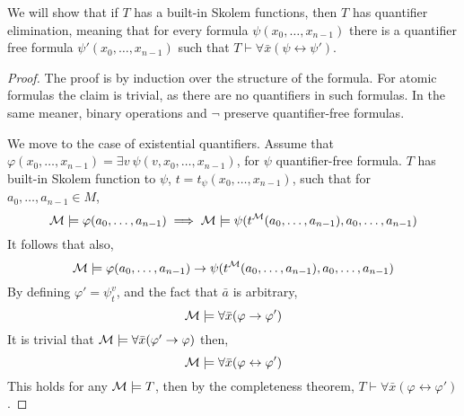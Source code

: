 \subquestion{}
We will show that if $T$ has a built-in Skolem functions, then $T$ has quantifier elimination,
meaning that for every formula $\psi(x_0, \ldots, x_{n - 1})$ there is a quantifier free formula $\psi'(x_0, \ldots, x_{n - 1})$ such that $T \vdash \forall \bar{x} (\psi \leftrightarrow \psi')$.
\begin{proof}
	The proof is by induction over the structure of the formula.
	For atomic formulas the claim is trivial, as there are no quantifiers in such formulas.
	In the same meaner, binary operations and $\lnot$ preserve quantifier-free formulas.

	We move to the case of existential quantifiers.
	Assume that $\varphi(x_0, \ldots, x_{n - 1}) = \exists v\ \psi(v, x_0, \ldots, x_{n - 1})$, for $\psi$ quantifier-free formula.
	$T$ has built-in Skolem function to $\psi$, $t = t_{\psi}(x_0, \ldots, x_{n - 1})$, such that for $a_0, \ldots, a_{n - 1} \in M$,
	\[
		\mathcal{M} \models \varphi(a_0, \ldots, a_{n - 1})
		\implies \mathcal{M} \models \psi(t^{\mathcal{M}}(a_0, \ldots, a_{n - 1}), a_0, \ldots, a_{n - 1})
	\]
	It follows that also,
	\[
		\mathcal{M} \models \varphi(a_0, \ldots, a_{n - 1}) \to \psi(t^{\mathcal{M}}(a_0, \ldots, a_{n - 1}), a_0, \ldots, a_{n - 1})
	\]
	By defining $\varphi' = \psi_t^v$, and the fact that $\bar{a}$ is arbitrary,
	\[
		\mathcal{M} \models \forall \bar{x} (\varphi \to \varphi')
	\]
	It is trivial that $\mathcal{M} \models \forall \bar{x} (\varphi' \to \varphi)$ then,
	\[
		\mathcal{M} \models \forall \bar{x} (\varphi \leftrightarrow \varphi')
	\]
	This holds for any $\mathcal{M} \models T$, then by the completeness theorem, $T \vdash \forall \bar{x} (\varphi \leftrightarrow \varphi')$.
\end{proof}

